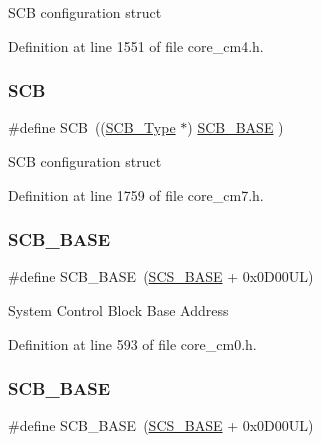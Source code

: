 S\+CB configuration struct 

Definition at line 1551 of file core\+\_\+cm4.\+h.

\mbox{\label{group___c_m_s_i_s__core__base_gaaaf6477c2bde2f00f99e3c2fd1060b01}} 
\subsubsection{\texorpdfstring{S\+CB}{SCB}\hspace{0.1cm}{\footnotesize\ttfamily [7/7]}}
{\footnotesize\ttfamily \#define S\+CB~((\hyperlink{struct_s_c_b___type}{S\+C\+B\+\_\+\+Type}       $\ast$)     \hyperlink{group___c_m_s_i_s__core__base_gad55a7ddb8d4b2398b0c1cfec76c0d9fd}{S\+C\+B\+\_\+\+B\+A\+SE}      )}

S\+CB configuration struct 

Definition at line 1759 of file core\+\_\+cm7.\+h.

\mbox{\label{group___c_m_s_i_s__core__base_gad55a7ddb8d4b2398b0c1cfec76c0d9fd}} 
\subsubsection{\texorpdfstring{S\+C\+B\+\_\+\+B\+A\+SE}{SCB\_BASE}\hspace{0.1cm}{\footnotesize\ttfamily [1/7]}}
{\footnotesize\ttfamily \#define S\+C\+B\+\_\+\+B\+A\+SE~(\hyperlink{group___c_m_s_i_s__core__base_ga3c14ed93192c8d9143322bbf77ebf770}{S\+C\+S\+\_\+\+B\+A\+SE} +  0x0\+D00\+U\+L)}

System Control Block Base Address 

Definition at line 593 of file core\+\_\+cm0.\+h.

\mbox{\label{group___c_m_s_i_s__core__base_gad55a7ddb8d4b2398b0c1cfec76c0d9fd}} 
\subsubsection{\texorpdfstring{S\+C\+B\+\_\+\+B\+A\+SE}{SCB\_BASE}\hspace{0.1cm}{\footnotesize\ttfamily [2/7]}}
{\footnotesize\ttfamily \#define S\+C\+B\+\_\+\+B\+A\+SE~(\hyperlink{group___c_m_s_i_s__core__base_ga3c14ed93192c8d9143322bbf77ebf770}{S\+C\+S\+\_\+\+B\+A\+SE} +  0x0\+D00\+U\+L)}

